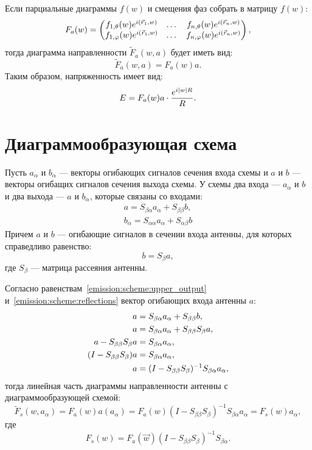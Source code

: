 Если парциальные диаграммы $f(w)$ и смещения фаз собрать в матрицу $f(w)$:
\begin{gather*}
    F_a(w) =
    \begin{pmatrix}
        f_{1,\theta}(w) e^{i \left ( \vec{r}_1, w \right )}  & \dots & f_{n,\theta}(w) e^{i \left ( \vec{r}_n, w \right )}  \\
        f_{1,\varphi}(w) e^{i \left ( \vec{r}_1, w \right )} & \dots & f_{n,\varphi}(w) e^{i \left ( \vec{r}_n, w \right )}
    \end{pmatrix} ,
\end{gather*}
тогда диаграмма направленности $\widetilde{F}_a(w,a)$ будет иметь вид:
\[
    \widetilde{F}_a(w,a) = F_a(w) a.
\]
Таким образом, напряженность имеет вид:
\[
    E = F_a(w) a \cdot \frac{e^{i \left | w \right | R}}{R} .
\]


\section{Диаграммообразующая схема}

Пусть $a_\alpha$ и $b_\alpha$ --- векторы огибающих сигналов сечения входа схемы и $a$ и $b$ --- векторы огибащих сигналов сечения выхода схемы. У схемы два входа ---
$a_\alpha$ и $b$ и два выхода --- $a$ и $b_\alpha$, которые связаны со входами:
\begin{gather}
    a        = S_{\beta \alpha} a_\alpha + S_{\beta \beta} b
    \label{emission:scheme:upper_output}, \\
    b_\alpha = S_{\alpha \alpha} a_\alpha + S_{\alpha \beta} b
    \label{emission:scheme:lower_output}
\end{gather}
Причем $a$ и $b$ --- огибающие сигналов в сечении входа антенны, для которых справедливо равенство:
\begin{equation}
    \label{emission:scheme:reflections}
    b = S_\beta a ,
\end{equation}
где $S_\beta$ --- матрица рассеяния антенны.

Согласно равенствам~\eqref{emission:scheme:upper_output} и~\eqref{emission:scheme:reflections} вектор огибающих входа антенны $a$:
\begin{align}
    a & = S_{\beta \alpha} a_\alpha + S_{\beta \beta} b , \notag \\
    a & = S_{\beta \alpha} a_\alpha + S_{\beta \beta} S_\beta a , \notag \\
    a - S_{\beta \beta} S_\beta a & = S_{\beta \alpha} a_\alpha , \notag \\
    ( I - S_{\beta \beta} S_\beta ) a & = S_{\beta \alpha} a_\alpha , \notag \\
    a & = ( I - S_{\beta \beta} S_\beta )^{-1} S_{\beta \alpha} a_\alpha , \label{emission:scheme:antenna_input}
\end{align}
тогда линейная часть диаграммы направленности антенны с диаграммообразующей схемой:
\[
    \widetilde{F}_s(w, a_\alpha)
    = F_a(w) a(a_\alpha)
    = F_a(w) ( I - S_{\beta \beta} S_\beta )^{-1} S_{\beta \alpha} a_\alpha
    = F_s(w) a_\alpha,
\]
где
\[
    F_s(w) = F_a(\vec{w}) ( I - S_{\beta \beta} S_\beta )^{-1} S_{\beta \alpha} .
\]

